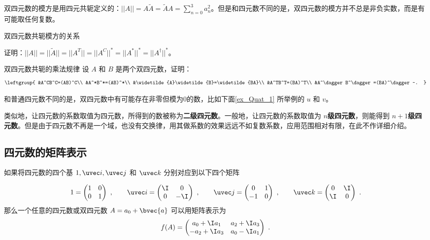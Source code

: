 双四元数的模方是用四元共轭定义的：$||A||=A\widetilde{A}=\widetilde{A}A=\sum^{3}_{n=0}a^2_n$。但是和四元数不同的是，双四元数的模方并不总是非负实数，而是有可能取任何复数。

\begin{exercise}{双四元数共轭模方的关系}

证明：$||A||=||\widetilde{A}||=||A^T||=||A^C||^*=||A^*||^*=||A^\dagger||^*$。

\end{exercise}

\begin{exercise}{双四元数共轭的乘法规律}
设 $A$ 和 $B$ 是两个双四元数，证明：
\begin{equation}
\leftgroup{
&A^CB^C=(AB)^C\\
&A^*B^*=(AB)^*\\
&\widetilde{A}\widetilde{B}=\widetilde{BA}\\
&A^TB^T=(BA)^T\\
&A^\dagger B^\dagger=(BA)^\dagger~.
}
\end{equation}

\end{exercise}

和普通四元数不同的是，双四元数中有可能存在非零但模为0的数，比如下面\autoref{ex_Quat_1} 所举例的 $u$ 和 $v$。

类似地，让四元数的系数取值为四元数，所得到的数被称为\textbf{二级四元数}。一般地，让四元数的系数取值为 $n$\textbf{级四元数}，则能得到 $n+1$\textbf{级四元数}。但是由于四元数不再是一个域，也没有交换律，用其做系数的效果远远不如复数系数，应用范围相对有限，在此不作详细介绍。


\subsection{四元数的矩阵表示}

如果将四元数的四个基 $1, \uvec i, \uvec j$ 和 $\uvec k$ 分别对应到以下四个矩阵

\begin{equation}
1=\begin{pmatrix}1&0\\0&1\end{pmatrix} ~,
\qquad
\uvec i=\begin{pmatrix}\I&0\\0&-\I\end{pmatrix}~,
\qquad
\uvec j=\begin{pmatrix}0&1\\-1&0\end{pmatrix}~,
\qquad
\uvec k=\begin{pmatrix}0&\I\\\I&0\end{pmatrix} ~.
\end{equation}
那么一个任意的四元数或双四元数 $A=a_0+\bvec{a}$ 可以用矩阵表示为
\begin{equation}
f(A)=\begin{pmatrix}a_0+\I a_1&a_2+\I a_3\\-a_2+\I a_3&a_0-\I a_1 \end{pmatrix} ~.
\end{equation}


